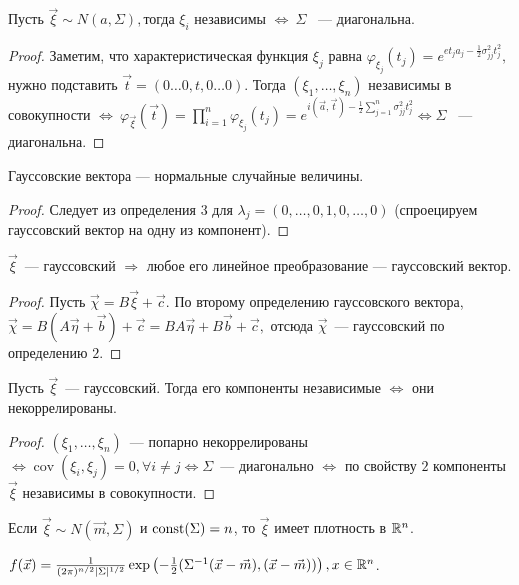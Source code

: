 	\begin{property}
		Пусть \(\vec{\xi}\sim N(a, \Sigma), \)тогда \(\xi_i\) независимы \(\Leftrightarrow~\Sigma\) ~--- диагональна.
		\begin{proof}
			Заметим, что характеристическая функция \(\xi_j\) равна \(\varphi_{\xi_j}(t_j) = e^{et_ja_j - \frac{1}{2}\sigma^2_{jj}t_j^2},\) нужно подставить \(\vec{t} = (0\ldots0, t, 0\ldots0).\) Тогда \((\xi_1, \ldots, \xi_n)\) независимы в совокупности \(\Leftrightarrow ~ \varphi_{\vec{\xi}}(\vec{t}) = \prod\limits_{i =1 }^n \varphi_{\xi_j}(t_j) = e^{i(\vec{a}, \vec{t}) - \frac{1}{2}\sum\limits_{j = 1}^{n}\sigma_{jj}^2t_j^2} \Leftrightarrow \Sigma\) ~--- диагональна.
		\end{proof}
	\end{property}

	\begin{property}[Коши]
		Гауссовские вектора --- нормальные случайные величины.
		\begin{proof}
			Следует из определения \(3\) для \(\lambda_j = (0, \ldots, 0, 1, 0, \ldots, 0)\) (спроецируем гауссовский вектор на одну из компонент).
		\end{proof}
	\end{property}

	\begin{property}
		\(\vec{\xi}\)~--- гауссовский \(\Rightarrow\) любое его линейное преобразование --- гауссовский вектор.
		\begin{proof}
			Пусть \(\vec{\chi} = B\vec{\xi} + \vec{c}.\) По второму определению гауссовского вектора, \(\vec{\chi} = B(A\vec{\eta} + \vec{b}) + \vec{c} = BA\vec{\eta} + B\vec{b} + \vec{c},\) отсюда \(\vec{\chi}\)~--- гауссовский по определению \(2.\)
		\end{proof}
	\end{property}
	
	\begin{property}
		Пусть \(\vec{\xi}\)~--- гауссовский. Тогда его компоненты независимые \(\Leftrightarrow\) они некоррелированы.
		\begin{proof}
			\((\xi_1, \ldots, \xi_n)\)~--- попарно некоррелированы \(\Leftrightarrow \operatorname{cov}(\xi_i, \xi_j) = 0, \forall i \neq j \Leftrightarrow \Sigma\)~--- диагонально \(\Leftrightarrow\) по свойству \(2\) компоненты \(\vec{\xi}\) независимы в совокупности.
		\end{proof}
	\end{property}
	
    \begin{property}
    	Если $\vec \xi \sim N(\vec{m}, \Sigma)$ и $\operatorname{const}(\Sigma) = n$, то $\vec{\xi}$ имеет плотность в $\mathbb{R}^n$.
    	
    	$f(\vec{x}) = \frac{1}{(2\pi)^{n / 2}|\Sigma|^{1/2}} \exp\left(-\frac{1}{2}(\Sigma^{-1}(\vec{x} - \vec{m}), (\vec{x} - \vec{m}))\right), x \in \mathbb{R}^n$.
    \end{property}

